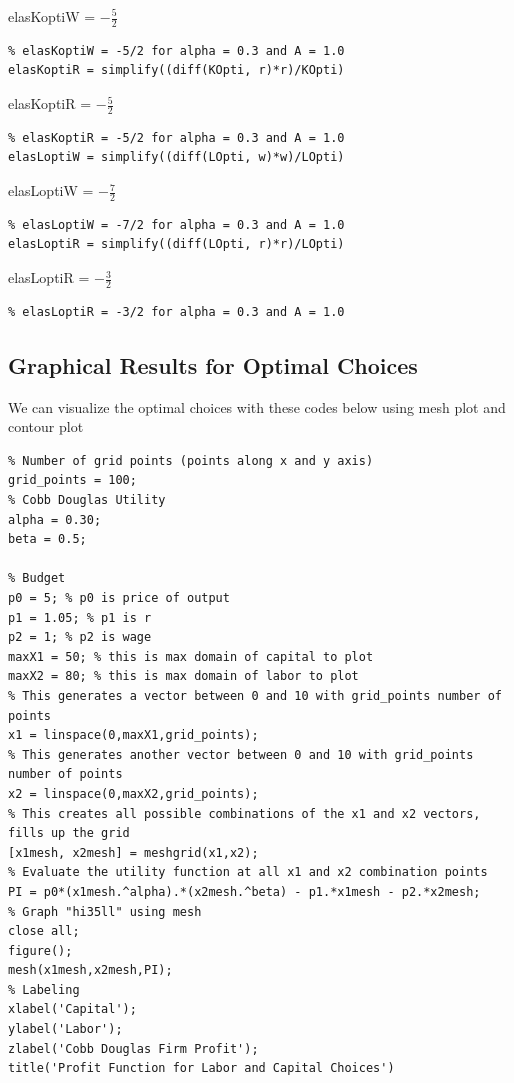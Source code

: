 \documentclass[
]{book}
\begin{document}
elasKoptiW = \(\displaystyle -\frac{5}{2}\)

\begin{verbatim}
% elasKoptiW = -5/2 for alpha = 0.3 and A = 1.0
elasKoptiR = simplify((diff(KOpti, r)*r)/KOpti)
\end{verbatim}

elasKoptiR = \(\displaystyle -\frac{5}{2}\)

\begin{verbatim}
% elasKoptiR = -5/2 for alpha = 0.3 and A = 1.0
elasLoptiW = simplify((diff(LOpti, w)*w)/LOpti)
\end{verbatim}

elasLoptiW = \(\displaystyle -\frac{7}{2}\)

\begin{verbatim}
% elasLoptiW = -7/2 for alpha = 0.3 and A = 1.0
elasLoptiR = simplify((diff(LOpti, r)*r)/LOpti)
\end{verbatim}

elasLoptiR = \(\displaystyle -\frac{3}{2}\)

\begin{verbatim}
% elasLoptiR = -3/2 for alpha = 0.3 and A = 1.0
\end{verbatim}

\hypertarget{graphical-results-for-optimal-choices}{%
\subsection{Graphical Results for Optimal Choices}\label{graphical-results-for-optimal-choices}}

We can visualize the optimal choices with these codes below using mesh
plot and contour plot

\begin{verbatim}
% Number of grid points (points along x and y axis)
grid_points = 100;
% Cobb Douglas Utility
alpha = 0.30;
beta = 0.5;

% Budget
p0 = 5; % p0 is price of output
p1 = 1.05; % p1 is r
p2 = 1; % p2 is wage
maxX1 = 50; % this is max domain of capital to plot
maxX2 = 80; % this is max domain of labor to plot
% This generates a vector between 0 and 10 with grid_points number of points
x1 = linspace(0,maxX1,grid_points);
% This generates another vector between 0 and 10 with grid_points number of points
x2 = linspace(0,maxX2,grid_points);
% This creates all possible combinations of the x1 and x2 vectors, fills up the grid
[x1mesh, x2mesh] = meshgrid(x1,x2);
% Evaluate the utility function at all x1 and x2 combination points
PI = p0*(x1mesh.^alpha).*(x2mesh.^beta) - p1.*x1mesh - p2.*x2mesh;
% Graph "hi35ll" using mesh
close all;
figure();
mesh(x1mesh,x2mesh,PI);
% Labeling
xlabel('Capital');
ylabel('Labor');
zlabel('Cobb Douglas Firm Profit');
title('Profit Function for Labor and Capital Choices')
\end{verbatim}
\end{document}
